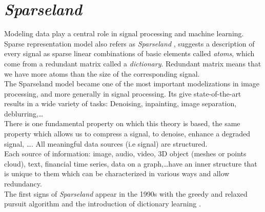 \section{\textit{Sparseland}}

Modeling data play a central role in signal processing and machine learning. Sparse representation model also refers as \textit{Sparseland} \cite{8398588},  suggests a description of every signal as sparse linear combinations of basic elements called \textit{atoms}, which come from a redundant matrix called a \textit{dictionary}. Redundant matrix means that we have more atoms than the size of the corresponding signal. \\
The Sparseland model became one of the most important modelizations in image processing, and more generally in signal processing. Its give state-of-the-art results in a wide variety of tasks: Denoising, inpainting, image separation, deblurring,\dots\\
There is one fundamental property on which this theory is based, the same property which allows us to compress a signal, to denoise, enhance a degraded signal, \dots. All meaningful data sources (i.e signal) are structured.\\
Each source of information: image, audio, video, 3D object (meshes or points cloud),  text, financial time series, data on a graph,\dots  have an inner structure that is unique to them which can be characterized in various ways and allow redundancy.\\

The first signs of \textit{Sparseland} appear in the 1990s with the greedy and relaxed pursuit algorithm \cite{258082,305222} and the introduction of dictionary learning \cite{Olshausen97sparsecoding}.

